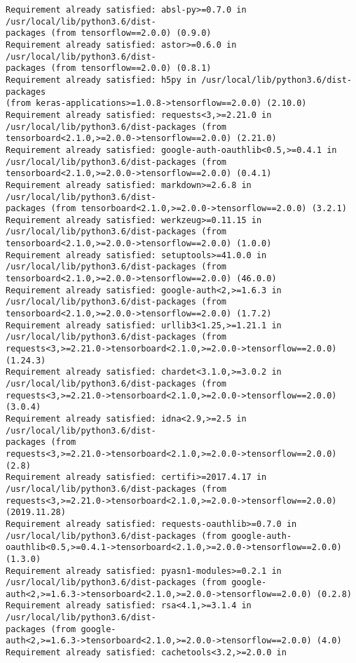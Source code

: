 \documentclass[11pt]{article}
\begin{document}
\begin{Verbatim}[commandchars=\\\{\}]
Requirement already satisfied: absl-py>=0.7.0 in /usr/local/lib/python3.6/dist-
packages (from tensorflow==2.0.0) (0.9.0)
Requirement already satisfied: astor>=0.6.0 in /usr/local/lib/python3.6/dist-
packages (from tensorflow==2.0.0) (0.8.1)
Requirement already satisfied: h5py in /usr/local/lib/python3.6/dist-packages
(from keras-applications>=1.0.8->tensorflow==2.0.0) (2.10.0)
Requirement already satisfied: requests<3,>=2.21.0 in
/usr/local/lib/python3.6/dist-packages (from
tensorboard<2.1.0,>=2.0.0->tensorflow==2.0.0) (2.21.0)
Requirement already satisfied: google-auth-oauthlib<0.5,>=0.4.1 in
/usr/local/lib/python3.6/dist-packages (from
tensorboard<2.1.0,>=2.0.0->tensorflow==2.0.0) (0.4.1)
Requirement already satisfied: markdown>=2.6.8 in /usr/local/lib/python3.6/dist-
packages (from tensorboard<2.1.0,>=2.0.0->tensorflow==2.0.0) (3.2.1)
Requirement already satisfied: werkzeug>=0.11.15 in
/usr/local/lib/python3.6/dist-packages (from
tensorboard<2.1.0,>=2.0.0->tensorflow==2.0.0) (1.0.0)
Requirement already satisfied: setuptools>=41.0.0 in
/usr/local/lib/python3.6/dist-packages (from
tensorboard<2.1.0,>=2.0.0->tensorflow==2.0.0) (46.0.0)
Requirement already satisfied: google-auth<2,>=1.6.3 in
/usr/local/lib/python3.6/dist-packages (from
tensorboard<2.1.0,>=2.0.0->tensorflow==2.0.0) (1.7.2)
Requirement already satisfied: urllib3<1.25,>=1.21.1 in
/usr/local/lib/python3.6/dist-packages (from
requests<3,>=2.21.0->tensorboard<2.1.0,>=2.0.0->tensorflow==2.0.0) (1.24.3)
Requirement already satisfied: chardet<3.1.0,>=3.0.2 in
/usr/local/lib/python3.6/dist-packages (from
requests<3,>=2.21.0->tensorboard<2.1.0,>=2.0.0->tensorflow==2.0.0) (3.0.4)
Requirement already satisfied: idna<2.9,>=2.5 in /usr/local/lib/python3.6/dist-
packages (from
requests<3,>=2.21.0->tensorboard<2.1.0,>=2.0.0->tensorflow==2.0.0) (2.8)
Requirement already satisfied: certifi>=2017.4.17 in
/usr/local/lib/python3.6/dist-packages (from
requests<3,>=2.21.0->tensorboard<2.1.0,>=2.0.0->tensorflow==2.0.0) (2019.11.28)
Requirement already satisfied: requests-oauthlib>=0.7.0 in
/usr/local/lib/python3.6/dist-packages (from google-auth-
oauthlib<0.5,>=0.4.1->tensorboard<2.1.0,>=2.0.0->tensorflow==2.0.0) (1.3.0)
Requirement already satisfied: pyasn1-modules>=0.2.1 in
/usr/local/lib/python3.6/dist-packages (from google-
auth<2,>=1.6.3->tensorboard<2.1.0,>=2.0.0->tensorflow==2.0.0) (0.2.8)
Requirement already satisfied: rsa<4.1,>=3.1.4 in /usr/local/lib/python3.6/dist-
packages (from google-
auth<2,>=1.6.3->tensorboard<2.1.0,>=2.0.0->tensorflow==2.0.0) (4.0)
Requirement already satisfied: cachetools<3.2,>=2.0.0 in

\end{Verbatim}
\end{document}
